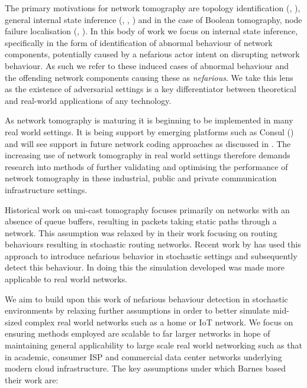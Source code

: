 The primary motivations for network tomography are topology identification (\cite{zhang_topology_2014}, \cite{hailiang_network_2009}), general internal state inference (\cite{vardi_network_1996}, \cite{coates_network_2001}, \cite{he_network_2021}) and in the case of Boolean tomography, node failure localisation (\cite{nguyen_boolean_2007}, \cite{ma_optimal_2015}). In this body of work we focus on internal state inference, specifically in the form of identification of abnormal behaviour of network components, potentially caused by a nefarious actor intent on disrupting network behaviour. As such we refer to these induced cases of abnormal behaviour and the offending network components causing these as \textit{nefarious}. We take this lens as the existence of adversarial settings is a key differentiator between theoretical and real-world applications of any technology.\par
As network tomography is maturing it is beginning to be implemented in many real world settings. It is being support by emerging platforms such as Consul (\cite{shilton_network_2021}) and will see support in future network coding approaches as discussed in \cite{kakkavas_review_2020}. The increasing use of network tomography in real world settings therefore demands research into methods of further validating and optimising the performance of network tomography in these industrial, public and private  communication infrastructure settings.\par
Historical work on uni-cast tomography focuses primarily on networks with an absence of queue buffers, resulting in packets taking static paths through a network. This assumption was relaxed by \cite{lai_measuring_2000} in their work focusing on routing behaviours resulting in stochastic routing networks. Recent work by \cite{barnes_stochastic_2020} has used this approach to introduce nefarious behavior in stochastic settings and subsequently detect this behaviour. In doing this the simulation developed was made more applicable to real world networks.\par
We aim to build upon this work of nefarious behaviour detection in stochastic environments by relaxing further assumptions in order to better simulate mid-sized complex real world networks such as a home or IoT network. We focus on ensuring methods employed are scalable to far larger networks in hope of maintaining general applicability to large scale real world networking such as that in academic, consumer ISP and commercial data center networks underlying modern cloud infrastructure. The key assumptions under which Barnes based their work are:\par
